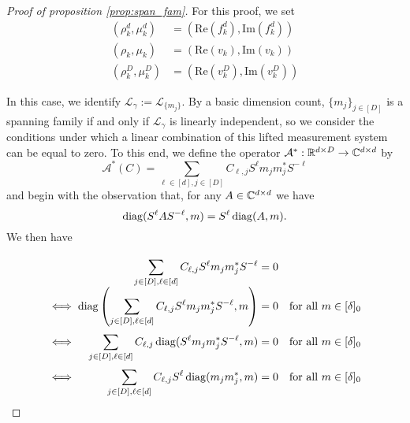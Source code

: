 \begin{proof}[Proof of proposition \ref{prop:span_fam}]
  For this proof, we set \begin{align*} (\rho_k^d, \mu_k^d) &= (\mathrm{Re}(f_k^d), \mathrm{Im}(f_k^d)) \\ (\rho_k, \mu_k) &= (\mathrm{Re}(v_k), \mathrm{Im}(v_k)) \\ (\rho_k^D, \mu_k^D) &= (\mathrm{Re}(v_k^D), \mathrm{Im}(v_k^D)) \end{align*}
  
  In this case, we identify $\mathcal{L}_\gamma := \mathcal{L}_{\{m_j\}}$.  By a basic dimension count, $\{m_j\}_{j \in [D]}$ is a spanning family if and only if $\mathcal{L}_\gamma$ is linearly independent, so we consider the conditions under which a linear combination of this lifted measurement system can be equal to zero.  To this end, we define the operator $\mathcal{A}^* : \mathbb{R}^{d \times D} \to \mathbb{C}^{d \times d}$ by \begin{equation} \mathcal{A}^*(C) = \sum_{\ell \in [d], j \in [D]} C_{\ell, j} S^\ell m_j m_j^* S^{-\ell} \label{eq:synth_op} \end{equation} and begin with the observation that, for any $A \in \mathbb{C}^{d \times d}$ we have \[\operatorname{diag}(S^\ell A S^{-\ell}, m) = S^\ell \operatorname{diag}(A, m).\]  We then have
  \[\arraycolsep=1.4pt\def\arraystretch{2}
  \begin{array}{c>{\displaystyle}rcl@{\quad}r}
    & \sum_{j \in [D], \ell \in [d]} C_{\ell, j} S^\ell m_j m_j^* S^{-\ell} & = & 0 & \\
    \iff & \diag\left(\sum_{j \in [D], \ell \in [d]} C_{\ell, j} S^\ell m_j m_j^* S^{-\ell}, m\right) & = & 0 & \text{for all} \ m \in [\delta]_0 \\
    \iff & \sum_{j \in [D], \ell \in [d]} C_{\ell, j} \diag(S^\ell m_j m_j^* S^{-\ell}, m) & = & 0 & \text{for all} \ m \in [\delta]_0 \\
    \iff & \sum_{j \in [D], \ell \in [d]} C_{\ell, j} S^{\ell} \diag(m_j m_j^*, m) & = & 0 & \text{for all} \ m \in [\delta]_0 \\
  \end{array}\]
  

\end{proof}
